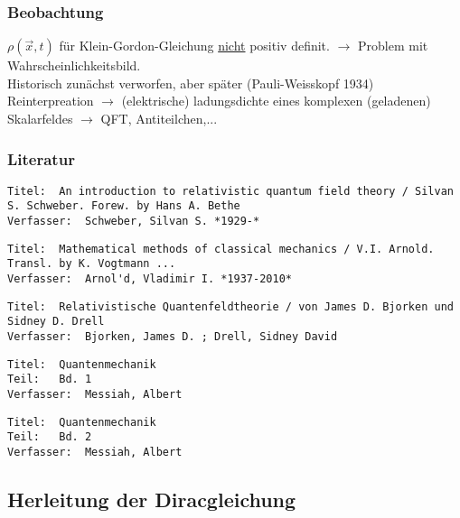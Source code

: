 \documentclass[twoside,a4paper]{scrartcl}
\renewcommand{\1}{\mathds{1}}
\newcommand{\ra}{\rightarrow}
\begin{document}
\subsubsection*{Beobachtung}
$\rho(\vec x,t)$ für Klein-Gordon-Gleichung \underline{nicht} positiv definit. $\ra$ Problem mit Wahrscheinlichkeitsbild.\\
Historisch zunächst verworfen, aber später (Pauli-Weisskopf 1934) Reinterpreation $\ra$ (elektrische) ladungsdichte eines komplexen (geladenen) Skalarfeldes $\ra$ QFT, Antiteilchen,...
\subsubsection*{Literatur}
\begin{tiny}
\begin{verbatim}
Titel: 	An introduction to relativistic quantum field theory / Silvan S. Schweber. Forew. by Hans A. Bethe
Verfasser: 	Schweber, Silvan S. *1929-*
\end{verbatim}
\end{tiny}


\begin{tiny}
\begin{verbatim}
Titel:	Mathematical methods of classical mechanics / V.I. Arnold. Transl. by K. Vogtmann ...
Verfasser:	Arnol'd, Vladimir I. *1937-2010*
\end{verbatim}
\begin{verbatim}
Titel: 	Relativistische Quantenfeldtheorie / von James D. Bjorken und Sidney D. Drell
Verfasser: 	Bjorken, James D. ; Drell, Sidney David
\end{verbatim}
\end{tiny}

\begin{tiny}
\begin{verbatim}
Titel: 	Quantenmechanik
Teil: 	Bd. 1
Verfasser: 	Messiah, Albert
\end{verbatim}
\end{tiny}

\begin{tiny}
\begin{verbatim}
Titel: 	Quantenmechanik
Teil: 	Bd. 2
Verfasser: 	Messiah, Albert
\end{verbatim}
\end{tiny}


\subsection{Herleitung der Diracgleichung}
\end{document}
